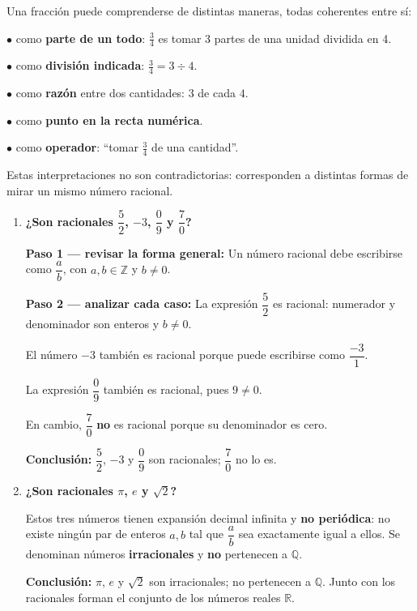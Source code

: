 \documentclass[11pt, letterpaper]{article}
\begin{document}
\begin{tcolorbox}[importantbox, title={Interpretaciones de una fracci\'on}]
Una fracci\'on puede comprenderse de distintas maneras, todas coherentes entre s\'i:

\medskip
\noindent$\bullet$ como \textbf{parte de un todo}: $\tfrac{3}{4}$ es tomar 3 partes de una unidad dividida en 4.

\noindent$\bullet$ como \textbf{divisi\'on indicada}: $\tfrac{3}{4} = 3\div 4$.

\noindent$\bullet$ como \textbf{raz\'on} entre dos cantidades: $3$ de cada $4$.

\noindent$\bullet$ como \textbf{punto en la recta num\'erica}.

\noindent$\bullet$ como \textbf{operador}: ``tomar $\tfrac{3}{4}$ de una cantidad''.

\medskip

Estas interpretaciones no son contradictorias: corresponden a distintas formas de mirar un mismo n\'umero racional.
\end{tcolorbox}

\begin{tcolorbox}[examplebox, title={Ejemplos --- Reconocer n\'umeros racionales}]
\begin{enumerate}[label=\textbf{Ej. \arabic*.}, leftmargin=*, itemsep=14pt]

\item \textbf{¿Son racionales $\dfrac{5}{2}$, $-3$, $\dfrac{0}{9}$ y $\dfrac{7}{0}$?}

\textbf{Paso 1 --- revisar la forma general:}
Un n\'umero racional debe escribirse como $\dfrac{a}{b}$, con $a,b\in\mathbb{Z}$ y $b\neq 0$.

\medskip
\textbf{Paso 2 --- analizar cada caso:}
La expresi\'on $\dfrac{5}{2}$ es racional: numerador y denominador son enteros y $b\neq 0$.

El n\'umero $-3$ tambi\'en es racional porque puede escribirse como $\dfrac{-3}{1}$.

La expresi\'on $\dfrac{0}{9}$ tambi\'en es racional, pues $9\neq 0$.

En cambio, $\dfrac{7}{0}$ \textbf{no} es racional porque su denominador es cero.

\medskip
\textbf{Conclusi\'on:}
$\dfrac{5}{2}$, $-3$ y $\dfrac{0}{9}$ son racionales; $\dfrac{7}{0}$ no lo es.

\item \textbf{¿Son racionales $\pi$, $e$ y $\sqrt{2}$?}

Estos tres n\'umeros tienen expansi\'on decimal infinita y \textbf{no peri\'odica}: no existe ning\'un par de enteros $a,b$ tal que $\dfrac{a}{b}$ sea exactamente igual a ellos. Se denominan n\'umeros \textbf{irracionales} y \textbf{no} pertenecen a $\mathbb{Q}$.

\medskip
\textbf{Conclusi\'on:}
$\pi$, $e$ y $\sqrt{2}$ son irracionales; no pertenecen a $\mathbb{Q}$. Junto con los racionales forman el conjunto de los n\'umeros reales $\mathbb{R}$.

\end{enumerate}
\end{tcolorbox}
\end{document}
